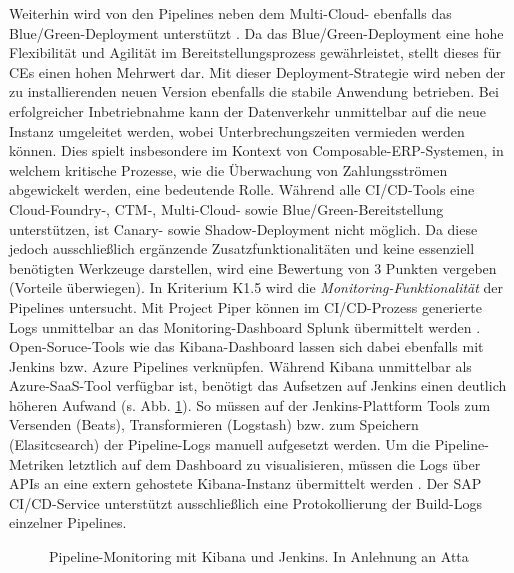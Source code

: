 Weiterhin wird von den Pipelines neben dem Multi-Cloud- ebenfalls das Blue/Green-Deployment unterstützt \cite{.20230406c}. Da das Blue/Green-Deployment eine hohe Flexibilität und Agilität im Bereitstellungsprozess gewährleistet, stellt dieses für CEs einen hohen Mehrwert dar. Mit dieser Deployment-Strategie wird neben der zu installierenden neuen Version ebenfalls die stabile Anwendung betrieben. Bei erfolgreicher Inbetriebnahme kann der Datenverkehr unmittelbar auf die neue Instanz umgeleitet werden, wobei Unterbrechungszeiten vermieden werden können. Dies spielt insbesondere im Kontext von Composable-ERP-Systemen, in welchem kritische Prozesse, wie die Überwachung von Zahlungsströmen abgewickelt werden, eine bedeutende Rolle. Während alle CI/CD-Tools eine Cloud-Foundry-, CTM-, Multi-Cloud- sowie Blue/Green-Bereitstellung unterstützen, ist Canary- sowie Shadow-Deployment nicht möglich. Da diese jedoch ausschließlich ergänzende Zusatzfunktionalitäten und keine essenziell benötigten Werkzeuge darstellen, wird eine Bewertung von 3 Punkten vergeben (Vorteile überwiegen). In Kriterium K1.5 wird die \textit{Monitoring-Funktionalität} der Pipelines untersucht. Mit Project Piper können im CI/CD-Prozess generierte Logs unmittelbar an das Monitoring-Dashboard Splunk übermittelt werden \cite[Z. 74 ff.]{ProductManagerSAPHyperspaceCICD.}. Open-Soruce-Tools wie das Kibana-Dashboard lassen sich dabei ebenfalls mit Jenkins bzw. Azure Pipelines verknüpfen. Während Kibana unmittelbar als Azure-SaaS-Tool verfügbar ist, benötigt das Aufsetzen auf Jenkins einen deutlich höheren Aufwand (s. Abb. \ref{fig:kibana}). So müssen auf der Jenkins-Plattform Tools zum Versenden (Beats), Transformieren (Logstash) bzw. zum Speichern (Elasitcsearch) der Pipeline-Logs manuell aufgesetzt werden. Um die Pipeline-Metriken letztlich auf dem Dashboard zu visualisieren, müssen die Logs über APIs an eine extern gehostete Kibana-Instanz übermittelt werden \cite{Atta.20201012}. Der SAP CI/CD-Service unterstützt ausschließlich eine Protokollierung der Build-Logs einzelner Pipelines.
\begin{center}
	\begin{figure}[H]
		\centering
		\caption[Pipeline-Monitoring mit Kibana und Jenkins]{Pipeline-Monitoring mit Kibana und Jenkins. In Anlehnung an Atta \cite{Atta.20201012}}
		\label{fig:kibana}
	\end{figure}
\end{center}
\vspace*{-15mm}
